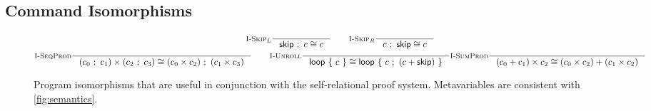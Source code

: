 \documentclass[p.tex]{subfiles}
\begin{document}
\subsection{Command Isomorphisms}\label{sec:iso}

\begin{figure}
\begin{spreadlines}{5pt}
\begin{gather*}
  \inference[$\textsc{I-Skip}_L$]{%
  }{%
    \cseq{\cskip}{c} \cong c
  }
  \qquad
  \inference[$\textsc{I-Skip}_R$]{%
  }{%
    \cseq{c}{\cskip} \cong c
  }
  \\
  \inference[\textsc{I-SeqProd}]{%
  }{%
    \cprod{(\cseq{c_0}{c_1})}{(\cseq{c_2}{c_3})} \cong
    \cseq{(\cprod{c_0}{c_2})}{(\cprod{c_1}{c_3})}
  }
  \qquad
  \inference[\textsc{I-Unroll}]{%
  }{%
    \cloop{c} \cong \cloop{\cseq{c}{(\csum{c}{\cskip})}}
  }
  \inference[\textsc{I-SumProd}]{%
  }{%
    \cprod{(\csum{c_0}{c_1})}{c_2} \cong
    \csum{(\cprod{c_0}{c_2})}{(\cprod{c_1}{c_2})}
  }
\end{gather*}
\end{spreadlines}
\caption{%
  Program isomorphisms that are useful in conjunction with the
  self-relational proof system. Metavariables are consistent with
  \cref{fig:semantics}.
}
\end{figure}
\end{document}
